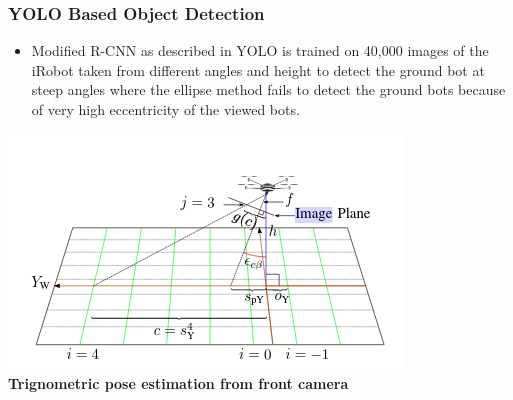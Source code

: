 \documentclass[12pt]{article}
\begin{document}
        \subsubsection{YOLO Based Object Detection}
            \begin{itemize}
                \item Modified R-CNN as described in YOLO is trained on 40,000 images of the iRobot taken from different angles and height to detect the ground bot at steep angles where the ellipse method fails to detect the ground bots because of very high eccentricity of the viewed bots.
            \end{itemize}
    \begin{center}\includegraphics[scale=0.44]{trig} \\
    \textbf{Trignometric pose estimation from front camera}\end{center}   
\end{document}
